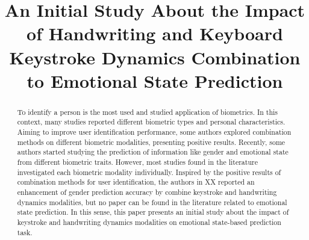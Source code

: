 \documentclass[conference]{IEEEtran}
\begin{document}
\title{An Initial Study About the Impact of Handwriting and Keyboard Keystroke Dynamics Combination to Emotional State Prediction\\
}


\maketitle

\begin{abstract}
To identify a person is the most used and studied application of biometrics. In this context, many studies reported different biometric types and personal characteristics. Aiming to improve user identification performance, some authors explored combination methods on different biometric modalities, presenting positive results. Recently, some authors started studying the prediction of information like gender and emotional state from different biometric traits. However, most studies found in the literature investigated each biometric modality individually. Inspired by the positive results of combination methods for user identification, the authors in XX reported an enhancement of gender prediction accuracy by combine keystroke and handwriting dynamics modalities, but no paper can be found in the literature related to emotional state prediction. In this sense, this paper presents an initial study about the impact of keystroke and handwriting dynamics modalities on emotional state-based prediction task.
\end{abstract}
\end{document}
